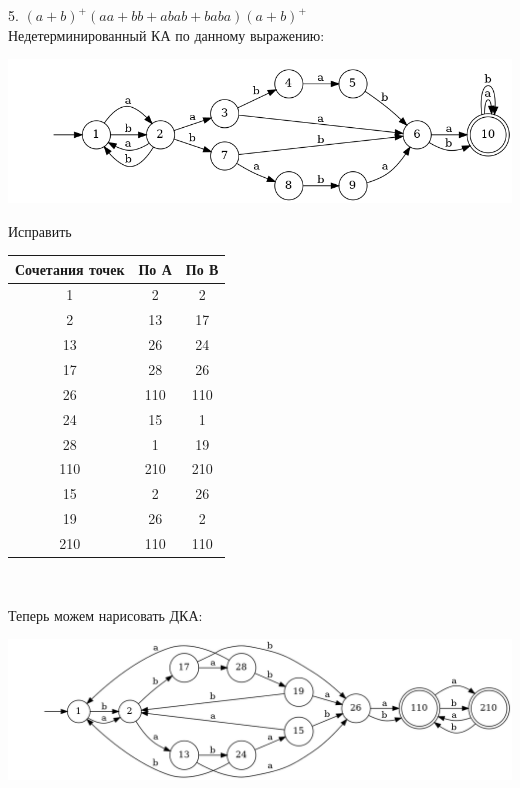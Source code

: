 \documentclass{article}
\begin{document}
    5. $(a+b)^+(aa+bb+abab+baba)(a+b)^+$\\
    Недетерминированный КА по данному выражению:
    \begin{center}
        \includegraphics[width=1\textwidth]{pic3_5_1.dot}\\
    \end{center}
    \begin{center}
        Исправить
        \begin{tabular}{|c|c|c|}
            \hline
            Сочетания точек & По А & По В \\
            \hline
                1 & 2 & 2\\
                2 & 13 & 17\\
                13 & 26 & 24 \\
                17 & 28 & 26\\
                26 & 110 & 110 \\
                24 & 15 & 1 \\
                28 & 1 & 19 \\
                110 & 210 & 210\\
                15 & 2 & 26\\
                19 & 26 & 2\\
                210 & 110 & 110\\
            \hline
        \end{tabular}\\
    \end{center}
    Теперь можем нарисовать ДКА:
    \begin{center}
        \includegraphics[width=1\textwidth]{pic3_5_2.dot}\\
    \end{center}
    
\end{document}
